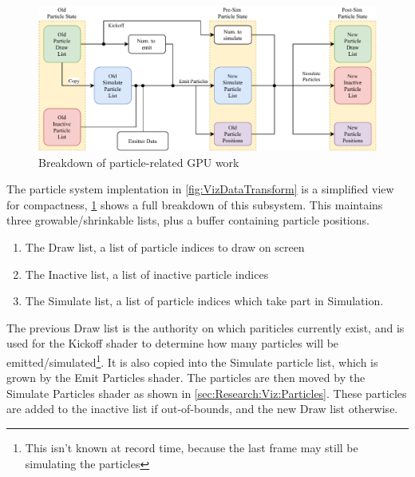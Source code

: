 \pagebreak
\begin{figure}[t]
    \centering
    \includegraphics[width=\linewidth]{Ch48Implementation/figures/FinalReport_VizData_Particles.pdf}
    \caption{Breakdown of particle-related GPU work}
    \label{fig:VizDataParticles}
\end{figure}
The particle system implentation in \cref{fig:VizDataTransform} is a simplified view for compactness, \cref{fig:VizDataParticles} shows a full breakdown of this subsystem.
This maintains three growable/shrinkable lists, plus a buffer containing particle positions.
\begin{enumerate}
    \item The Draw list, a list of particle indices to draw on screen
    \item The Inactive list, a list of inactive particle indices
    \item The Simulate list, a list of particle indices which take part in Simulation.
\end{enumerate}
The previous Draw list is the authority on which pariticles currently exist, and is used for the Kickoff shader to determine how many particles will be emitted/simulated\footnote{This isn't known at record time, because the last frame may still be simulating the particles}.
It is also copied into the Simulate particle list, which is grown by the Emit Particles shader.
The particles are then moved by the Simulate Particles shader as shown in \cref{sec:Research:Viz:Particles}.
These particles are added to the inactive list if out-of-bounds, and the new Draw list otherwise.

